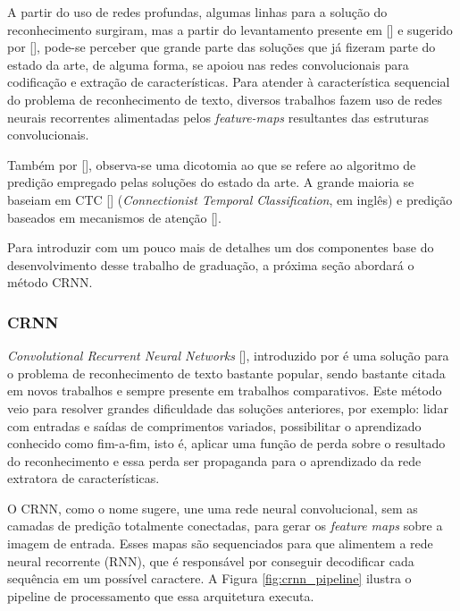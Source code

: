 A partir do uso de redes profundas, algumas linhas para a solução do reconhecimento surgiram, mas a partir do levantamento presente em [] e sugerido por [], pode-se perceber que grande parte das soluções que já fizeram parte do estado da arte, de alguma forma, se apoiou nas redes convolucionais para codificação e extração de características.
Para atender à característica sequencial do problema de reconhecimento de texto, diversos trabalhos fazem uso de redes neurais recorrentes alimentadas pelos \textit{feature-maps} resultantes das estruturas convolucionais.

Também por [], observa-se uma dicotomia ao que se refere ao algoritmo de predição empregado pelas soluções do estado da arte. A grande maioria se baseiam em CTC [] (\textit{Connectionist Temporal Classification}, em inglês) e predição baseados em mecanismos de atenção [].

Para introduzir com um pouco mais de detalhes um dos componentes base do desenvolvimento desse trabalho de graduação, a próxima seção abordará o método CRNN.



\subsubsection{CRNN} \label{crnn}
\textit{Convolutional Recurrent Neural Networks} [], introduzido por \citeauthor{CRNN} é uma solução para o problema de reconhecimento de texto bastante popular, sendo bastante citada em novos trabalhos e sempre presente em trabalhos comparativos. Este método veio para resolver grandes dificuldade das soluções anteriores, por exemplo: lidar com entradas e saídas de comprimentos variados, possibilitar o aprendizado conhecido como fim-a-fim, isto é, aplicar uma função de perda sobre o resultado do reconhecimento e essa perda ser propaganda para o aprendizado da rede extratora de características.

O CRNN, como o nome sugere, une uma rede neural convolucional, sem as camadas de predição totalmente conectadas, para gerar os \textit{feature maps} sobre a imagem de entrada. Esses mapas são sequenciados para que alimentem a rede neural recorrente (RNN), que é responsável por conseguir decodificar cada sequência em um possível caractere. A Figura \ref{fig:crnn_pipeline} ilustra o pipeline de processamento que essa arquitetura executa.

